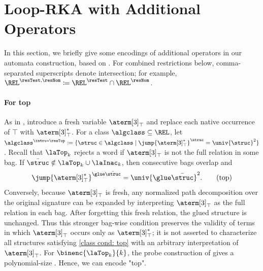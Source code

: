 \documentclass[a4paper,UKenglish,cleveref, autoref, thm-restate]{lipics-v2021}
\DeclarePairedDelimiter\set{\{}{\}}
\newcommand{\defeq}{\coloneq}
\newcommand{\mul}[1]{\bar{#1}}
\begin{document}
\section{Loop-RKA with Additional Operators}\label{section: encoding extras}
In this section,
we briefly give some encodings of additional operators in our automata construction, based on \cite{nakamuraDerivativesGraphsPositive2025}.
For combined restrictions below, comma-separated superscripts denote intersection; for example,
$\REL^{\resTest,\resNom}\defeq\REL^{\resTest}\cap\REL^{\resNom}$.
\paragraph*{For top}
As in , introduce a fresh variable $\aterm[3]_{\top}$
and replace each native occurrence of $\top$ with $\aterm[3]_{\top}^{*}$.
For a class $\algclass\subseteq\REL$, let
$\algclass^{\intro*\resTop}\defeq
\set{\struc\in\algclass\mid \jump{\aterm[3]_{\top}^{*}}^{\struc}=\univ{\struc}^{2}}$.
Recall that $\laTop_k$ rejects a word if $\aterm[3]_{\top}$ is not the full relation in some bag.
If $\mul{\struc} \notin \laTop_k \cup \laInac_k$, then consecutive bags overlap and
\[
\jump{\aterm[3]_{\top}^{*}}^{\glue\mul{\struc}}=\univ{\glue\mul{\struc}}^2.
\tag{top}\label{class cond: top}
\]
Conversely, because $\aterm[3]_{\top}$ is fresh, any normalized path decomposition over the original signature
can be expanded by interpreting $\aterm[3]_{\top}$ as the full relation in each bag.
After forgetting this fresh relation, the glued structure is unchanged.
Thus this stronger bag-wise condition preserves the validity of terms in which $\aterm[3]_{\top}$ occurs only as $\aterm[3]_{\top}^{*}$;
it is not asserted to characterize all structures satisfying \eqref{class cond: top} with an arbitrary interpretation of $\aterm[3]_{\top}$.
For $\binenc{\laTop_{k}}{k}$, the probe construction of
 gives a polynomial-size .
Hence, we can encode "top".

%
%
%
%
\end{document}
